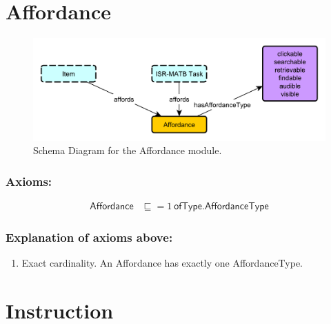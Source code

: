 \newpage
\section{Affordance}
\label{ssec:affordance}

\begin{figure}[h!]
\begin{center}
\includegraphics[width=.8\textwidth]{resources/Affordance.pdf}
\end{center}
\caption{Schema Diagram for the \textsf{Affordance} module.}
\label{fig:affordance}
\end{figure}

\subsubsection*{Axioms:}

\begin{align}
\textsf{Affordance} &\sqsubseteq =1~\textsf{ofType.AffordanceType}
\end{align}

\subsubsection*{Explanation of axioms above:}

\begin{enumerate}
\item Exact cardinality. An \textsf{Affordance} has exactly one \textsf{AffordanceType}.
\end{enumerate}

\newpage
\section{Instruction}
\label{ssec:instruction}

